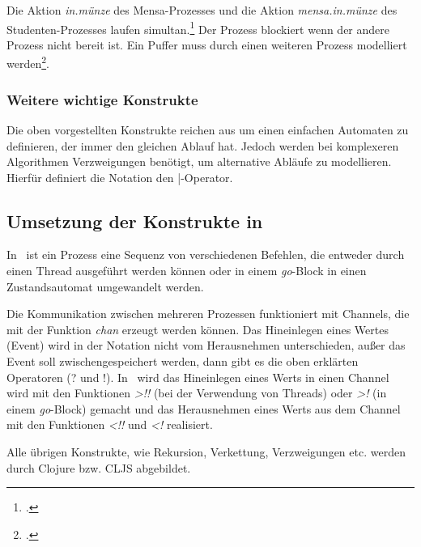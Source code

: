 Die Aktion \textit{in.münze} des Mensa-Prozesses und die Aktion \textit{mensa.in.münze} des Studenten-Prozesses laufen simultan.\footcite[vgl. Seite 117]{CSPBOOK} Der Prozess blockiert wenn der andere Prozess nicht bereit ist. Ein Puffer muss durch einen weiteren Prozess modelliert werden\footcite[vgl. Seite 133]{CSPBOOK}.


\subsubsection{Weitere wichtige Konstrukte}
Die oben vorgestellten Konstrukte reichen aus um einen einfachen Automaten zu definieren, der immer den gleichen Ablauf hat. Jedoch werden bei komplexeren Algorithmen Verzweigungen benötigt, um alternative Abläufe zu modellieren. Hierfür definiert die Notation den |-Operator.

\subsection{Umsetzung der Konstrukte in \CA}
In \CA\ ist ein Prozess eine Sequenz von verschiedenen Befehlen, die entweder durch einen Thread ausgeführt werden können oder in einem \textit{go}-Block in einen Zustandsautomat umgewandelt werden.

Die Kommunikation zwischen mehreren Prozessen funktioniert mit Channels, die mit der Funktion \textit{chan} erzeugt werden können. Das Hineinlegen eines Wertes (Event) wird in der Notation nicht vom Herausnehmen unterschieden, außer das Event soll zwischengespeichert werden, dann gibt es die oben erklärten Operatoren (? und !). In \CA\ wird das Hineinlegen eines Werts in einen Channel wird mit den Funktionen \textit{>!!} (bei der Verwendung von Threads) oder \textit{>!} (in einem \textit{go}-Block) gemacht und das Herausnehmen eines Werts aus dem Channel mit den Funktionen \textit{<!!} und \textit{<!} realisiert.

Alle übrigen Konstrukte, wie Rekursion, Verkettung, Verzweigungen etc. werden durch Clojure bzw. \acl{CLJS} abgebildet.

